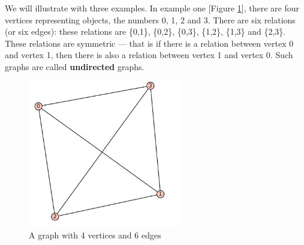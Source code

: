 We will illustrate with three examples. In example one [Figure \ref{1g1}], there are four vertices representing objects, the numbers 0, 1, 2 and 3. There are six relations (or six edges): these relations are \{0,1\}, \{0,2\}, \{0,3\}, \{1,2\}, \{1,3\} and \{2,3\}. These relations are symmetric --- that is if there is a relation between vertex 0 and vertex 1, then there is also a relation between vertex 1 and vertex 0. Such graphs are called \textbf{undirected} graphs.
\begin{figure}
\begin{center}
\includegraphics[width=0.6\textwidth]{example.JPG}
\caption{A graph with 4 vertices and 6 edges}\label{1g1}
\end{center}
\end{figure}
\begin{newpage}
\end{newpage}

